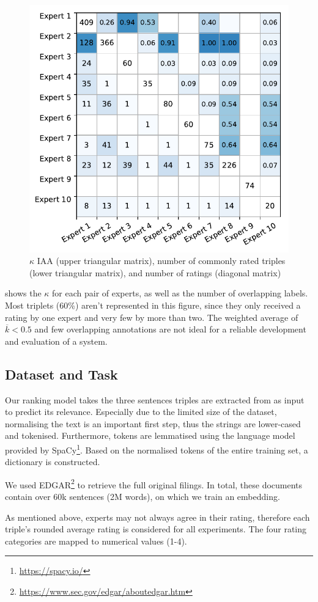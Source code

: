 \begin{figure}
	\includegraphics[width=0.7\linewidth]{iaa}
	\caption{$\kappa$ IAA (upper triangular matrix), number of commonly rated triples (lower triangular matrix), and number of ratings (diagonal matrix)}
	\label{fig:iaa}
\end{figure}

 shows the $\kappa$ for each pair of experts, as well as the number of overlapping labels. Most triplets (60\%) aren't represented in this figure, since they only received a rating by one expert and very few by more than two. The weighted average of $\overline{k}<0.5$ and few overlapping annotations are not ideal for a reliable development and evaluation of a system.

\subsection{Dataset and Task}
Our ranking model takes the three sentences triples are extracted from as input to predict its relevance.
Especially due to the limited size of the dataset, normalising the text is an important first step, thus the strings are lower-cased and tokenised. 
Furthermore, tokens are lemmatised using the language model provided by SpaCy\footnote{\url{https://spacy.io/}}.
Based on the normalised tokens of the entire training set, a dictionary is constructed.

We used EDGAR\footnote{\url{https://www.sec.gov/edgar/aboutedgar.htm}} to retrieve the full original filings. In total, these documents contain over 60k sentences (2M words), on which we train an embedding.

As mentioned above, experts may not always agree in their rating, therefore each triple's rounded average rating is considered for all experiments.
The four rating categories are mapped to numerical values (1-4).

